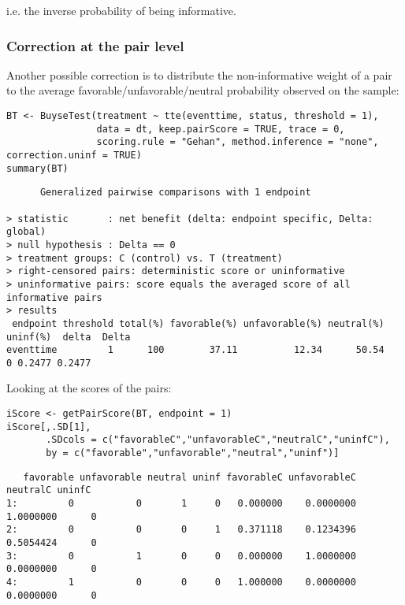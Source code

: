 \documentclass[12pt]{article}
\begin{document}
i.e. the inverse probability of being informative. 

\subsubsection{Correction at the pair level}
\label{sec:org2eaed0f}

Another possible correction is to distribute the non-informative
weight of a pair to the average favorable/unfavorable/neutral
probability observed on the sample:
\lstset{language=r,label= ,caption= ,captionpos=b,numbers=none}
\begin{lstlisting}
BT <- BuyseTest(treatment ~ tte(eventtime, status, threshold = 1),
				data = dt, keep.pairScore = TRUE, trace = 0,
				scoring.rule = "Gehan", method.inference = "none", correction.uninf = TRUE)
summary(BT)
\end{lstlisting}

\begin{verbatim}
      Generalized pairwise comparisons with 1 endpoint

> statistic       : net benefit (delta: endpoint specific, Delta: global) 
> null hypothesis : Delta == 0 
> treatment groups: C (control) vs. T (treatment) 
> right-censored pairs: deterministic score or uninformative
> uninformative pairs: score equals the averaged score of all informative pairs
> results
 endpoint threshold total(%) favorable(%) unfavorable(%) neutral(%) uninf(%)  delta  Delta
eventtime         1      100        37.11          12.34      50.54        0 0.2477 0.2477
\end{verbatim}


Looking at the scores of the pairs:
\lstset{language=r,label= ,caption= ,captionpos=b,numbers=none}
\begin{lstlisting}
iScore <- getPairScore(BT, endpoint = 1)
iScore[,.SD[1], 
	   .SDcols = c("favorableC","unfavorableC","neutralC","uninfC"),
	   by = c("favorable","unfavorable","neutral","uninf")]
\end{lstlisting}

\begin{verbatim}
   favorable unfavorable neutral uninf favorableC unfavorableC  neutralC uninfC
1:         0           0       1     0   0.000000    0.0000000 1.0000000      0
2:         0           0       0     1   0.371118    0.1234396 0.5054424      0
3:         0           1       0     0   0.000000    1.0000000 0.0000000      0
4:         1           0       0     0   1.000000    0.0000000 0.0000000      0
\end{verbatim}
\end{document}
